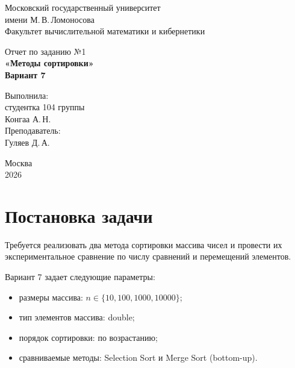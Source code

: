 \documentclass[a4paper,12pt]{article}
\newcommand{\code}[1]{{\ttfamily #1}}
\begin{document}
\begin{titlepage}
\begin{center}
Московский государственный университет\\
имени М.\,В.\,Ломоносова\\
Факультет вычислительной математики и кибернетики
\end{center}

\vfill

\begin{center}
{\fontsize{18}{22}\selectfont Отчет по заданию №1}\\[6pt]
{\bfseries\fontsize{18}{22}\selectfont «Методы сортировки»}\\[10pt]
{\bfseries\fontsize{16}{20}\selectfont Вариант 7}
\end{center}

\vfill

\begin{flushright}
Выполнила:\\
студентка 104 группы\\
Конгаа А.\,Н.\\[14pt]
Преподаватель:\\
Гуляев Д.\,А.
\end{flushright}

\vfill

\begin{center}
Москва\\
2026
\end{center}
\end{titlepage}

\tableofcontents

\section{Постановка задачи}

Требуется реализовать два метода сортировки массива чисел и провести их
экспериментальное сравнение по числу сравнений и перемещений элементов.

Вариант 7 задает следующие параметры:
\begin{itemize}
\item размеры массива: $n \in \{10, 100, 1000, 10000\}$;
\item тип элементов массива: \code{double};
\item порядок сортировки: по возрастанию;
\item сравниваемые методы: Selection Sort и Merge Sort (bottom-up).
\end{itemize}
\end{document}

